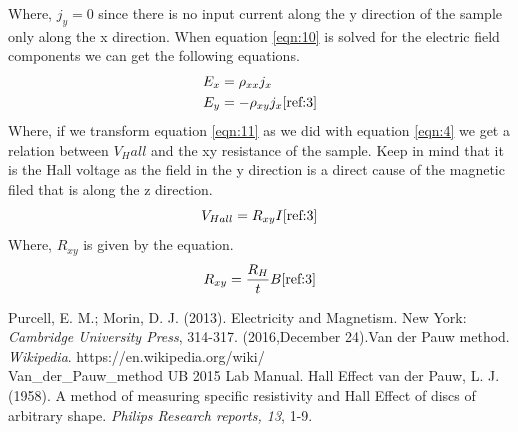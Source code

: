 \documentclass[twocolumn]{article}
\begin{document}
Where, $j_y = 0$ since there is no input current along the y direction of the 
sample only along the x direction. When equation \ref{eqn:10} is solved for the 
electric field components we can get the following equations.
\begin{equation}
\begin{align*}
E_x &= \rho_{xx}j_x\\
E_y &= -\rho_{xy}j_x
\cite{ref:3}
\label{eqn:11}
\end{align*}
\end{equation}
Where, if we transform equation \ref{eqn:11} as we did with equation 
\ref{eqn:4} we get a 
relation between $V_Hall$ and the xy resistance of the sample. Keep in mind 
that it is the Hall voltage as the field in the y direction is a direct cause 
of the magnetic filed that is along the z direction.
\begin{equation}
V_{Hall} = R_{xy}I
\cite{ref:3}
\label{eqn:12}
\end{equation}
Where, $R_{xy}$ is given by the equation.
\begin{equation}
R_{xy} = \frac{R_H}{t}B
\cite{ref:3}
\label{eqn:12}
\end{equation}

\begin{thebibliography}{9}
Purcell, E. M.; Morin, D. J. (2013). Electricity and Magnetism. New York: 
\emph{Cambridge University Press}, 314-317.
(2016,December 24).Van der Pauw method. \emph{Wikipedia}. 
https://en.wikipedia.org/wiki/\\Van\_der\_Pauw\_method
UB 2015 Lab Manual. Hall Effect
van der Pauw, L. J. (1958). A method of measuring specific resistivity and 
Hall Effect of discs of arbitrary shape. \emph{Philips Research reports, 13}, 
1-9.
\end{thebibliography}
\end{document}

